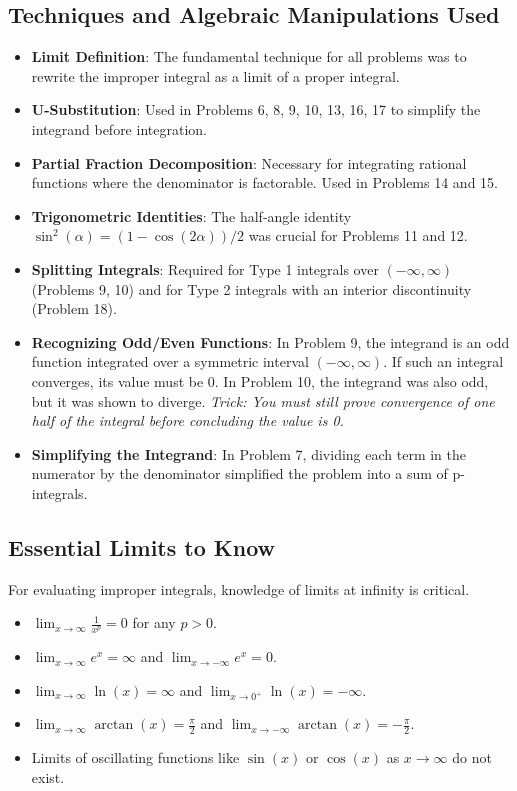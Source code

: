 \documentclass{article}
\begin{document}
\subsection{Techniques and Algebraic Manipulations Used}
\begin{itemize}
    \item \textbf{Limit Definition}: The fundamental technique for all problems was to rewrite the improper integral as a limit of a proper integral.
    \item \textbf{U-Substitution}: Used in Problems 6, 8, 9, 10, 13, 16, 17 to simplify the integrand before integration.
    \item \textbf{Partial Fraction Decomposition}: Necessary for integrating rational functions where the denominator is factorable. Used in Problems 14 and 15.
    \item \textbf{Trigonometric Identities}: The half-angle identity $ \sin^2(\alpha) = (1-\cos(2\alpha))/2 $ was crucial for Problems 11 and 12.
    \item \textbf{Splitting Integrals}: Required for Type 1 integrals over $(-\infty, \infty)$ (Problems 9, 10) and for Type 2 integrals with an interior discontinuity (Problem 18).
    \item \textbf{Recognizing Odd/Even Functions}: In Problem 9, the integrand is an odd function integrated over a symmetric interval $(-\infty, \infty)$. If such an integral converges, its value must be 0. In Problem 10, the integrand was also odd, but it was shown to diverge. \textit{Trick: You must still prove convergence of one half of the integral before concluding the value is 0.}
    \item \textbf{Simplifying the Integrand}: In Problem 7, dividing each term in the numerator by the denominator simplified the problem into a sum of p-integrals.
\end{itemize}

\subsection{Essential Limits to Know}
For evaluating improper integrals, knowledge of limits at infinity is critical.
\begin{itemize}
    \item $ \lim_{x \to \infty} \frac{1}{x^p} = 0 $ for any $ p > 0 $.
    \item $ \lim_{x \to \infty} e^x = \infty $ and $ \lim_{x \to -\infty} e^x = 0 $.
    \item $ \lim_{x \to \infty} \ln(x) = \infty $ and $ \lim_{x \to 0^+} \ln(x) = -\infty $.
    \item $ \lim_{x \to \infty} \arctan(x) = \frac{\pi}{2} $ and $ \lim_{x \to -\infty} \arctan(x) = -\frac{\pi}{2} $.
    \item Limits of oscillating functions like $ \sin(x) $ or $ \cos(x) $ as $ x \to \infty $ do not exist.
\end{itemize}
\end{document}
